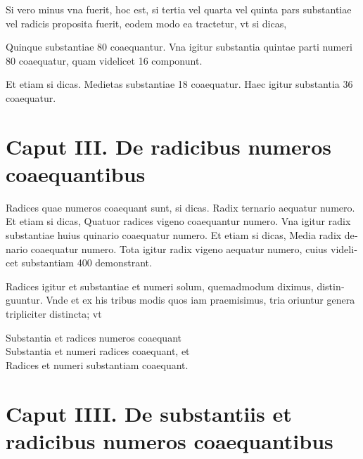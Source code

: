 \documentclass[11pt,a4paper]{book}
\begin{document}
\textlatin{Si vero minus vna fuerit, hoc est, si tertia vel quarta vel quinta pars substantiae vel radicis proposita fuerit, eodem modo ea tractetur, vt si dicas,}

\textlatin{Quinque substantiae 80 coaequantur. Vna igitur substantia quintae parti numeri 80 coaequatur, quam videlicet 16 componunt.}

\textlatin{Et etiam si dicas. Medietas substantiae 18 coaequatur. Haec igitur substantia 36 coaequatur.}

\vspace{0.5cm}

\section*{Caput III. De radicibus numeros coaequantibus}

\textlatin{Radices quae numeros coaequant sunt, si dicas. Radix ternario aequatur numero. Et etiam si dicas, Quatuor radices vigeno coaequantur numero. Vna igitur radix substantiae huius quinario coaequatur numero. Et etiam si dicas, Media radix denario coaequatur numero. Tota igitur radix vigeno aequatur numero, cuius videlicet substantiam 400 demonstrant.}

\vspace{0.5cm}

\textlatin{Radices igitur et substantiae et numeri solum, quemadmodum diximus, distinguuntur. Vnde et ex his tribus modis quos iam praemisimus, tria oriuntur genera tripliciter distincta; vt}

\begin{center}
\textlatin{Substantia et radices numeros coaequant}\\
\textlatin{Substantia et numeri radices coaequant, et}\\
\textlatin{Radices et numeri substantiam coaequant.}
\end{center}

\vspace{0.5cm}

\section*{Caput IIII. De substantiis et radicibus numeros coaequantibus}
\end{document}
